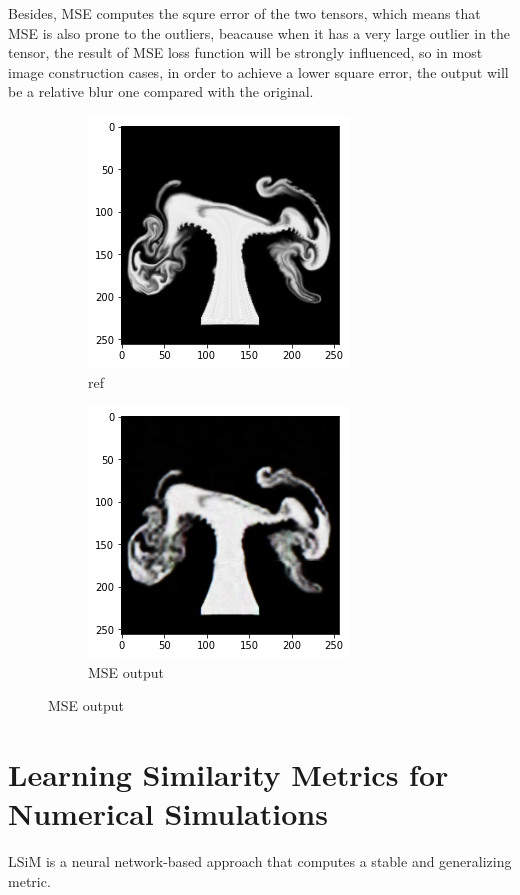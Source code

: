 \documentclass[a4paper,12pt,twoside]{report}
\begin{document}
Besides, MSE computes the squre error of the two tensors, which means that MSE is also prone to the outliers, beacause when it has a very large outlier in the tensor, the result of MSE loss function will be strongly influenced, so in most image construction cases, in order to achieve a lower square error, the output will be a relative blur one compared with the original.
\begin{figure}
\centering
\begin{subfigure}{0.4\textwidth}
  \centering
  \includegraphics[scale=0.5]{MSEref.png}
  \caption{ref}
\end{subfigure}
\begin{subfigure}{0.4\textwidth}
  \centering
  \includegraphics[scale=0.5]{MSEblur.png}
  \caption{MSE output}
\end{subfigure}
\end{figure}

\section{Learning Similarity Metrics for Numerical Simulations}

LSiM is a neural network-based approach that computes a stable and generalizing metric. 
\end{document}
